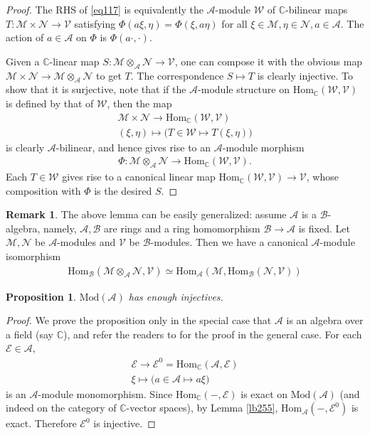 \documentclass[12pt,b5paper,notitlepage]{report}
\theoremstyle{definition}
\newtheorem{rem}[df]{Remark}
\theoremstyle{plain}
\newtheorem{pp}[df]{Proposition}
\newcommand{\mc}{\mathcal}
\newcommand{\Hom}{\mathrm{Hom}}
\newcommand{\Cbb}{\mathbb C}
\newcommand{\Mod}{\mathrm{Mod}}
\numberwithin{equation}{section}
\begin{document}
\begin{proof}
The RHS of \eqref{eq117} is equivalently the $\mc A$-module $\mc W$ of $\Cbb$-bilinear maps $T:\mc M\times\mc N\rightarrow \mc V$ satisfying $\Phi(a\xi,\eta)=\Phi(\xi, a\eta)$ for all $\xi\in\mc M,\eta\in\mc N,a\in\mc A$. The action of $a\in\mc A$ on $\Phi$ is $\Phi(a\cdot,\cdot)$.


Given a $\Cbb$-linear map $S:\mc M\otimes_{\mc A}\mc N\rightarrow\mc V$, one can compose it with the obvious map $\mc M\times\mc N\rightarrow\mc M\otimes_{\mc A}\mc N$ to get $T$. The correspondence $S\mapsto T$ is clearly injective. To show that it is surjective, note that if the $\mc A$-module structure on $\Hom_\Cbb(\mc W,\mc V)$ is defined by that of $\mc W$, then the map
\begin{gather*}
\mc M\times\mc N\rightarrow\Hom_\Cbb(\mc W,\mc V)\\
(\xi,\eta)\mapsto  \big(T\in\mc W\mapsto T(\xi,\eta) \big)
\end{gather*}
is clearly $\mc A$-bilinear, and hence gives rise to an $\mc A$-module morphism
\begin{align*}
\Phi:\mc M\otimes_{\mc A}\mc N\rightarrow \Hom_\Cbb(\mc W,\mc V).
\end{align*}
Each $T\in\mc W$ gives rise to a canonical linear map $\Hom_\Cbb(\mc W,\mc V)\rightarrow \mc V$, whose composition with $\Phi$ is the desired $S$.
\end{proof}


\begin{rem}
The above lemma can be easily generalized: assume $\mc A$ is a $\mc B$-algebra, namely, $\mc A,\mc B$ are rings and a ring homomorphism $\mc B\rightarrow\mc A$ is fixed. Let $\mc M,\mc N$ be $\mc A$-modules and $\mc V$ be $\mc B$-modules. Then we have a canonical $\mc A$-module isomorphism
\begin{align*}
\Hom_{\mc B}(\mc M\otimes_{\mc A}\mc N,\mc V)\simeq \Hom_{\mc A}(\mc M,\Hom_{\mc B}(\mc N,\mc V))
\end{align*}
\end{rem}



\begin{pp}\label{lb311}
$\Mod(\mc A)$ has enough injectives.
\end{pp}




\begin{proof}
We prove the proposition only in the special case that $\mc A$ is an algebra over a field (say $\Cbb$), and refer the readers to \cite[Sec. XX.4]{Lang} for the proof in the general case. For each $\mc E\in\mc A$,
\begin{gather*}
\mc E\rightarrow \mc E^0=\Hom_\Cbb(\mc A,\mc E)\\
\xi\mapsto \big(a\in\mc A\mapsto a\xi\big)
\end{gather*}
is an $\mc A$-module monomorphism. Since $\Hom_\Cbb(-,\mc E)$ is exact on $\Mod(\mc A)$ (and indeed on the category of $\Cbb$-vector spaces), by Lemma \ref{lb255}, $\Hom_{\mc A}(-,\mc E^0)$ is exact. Therefore $\mc E^0$ is injective.
\end{proof}
\end{document}
